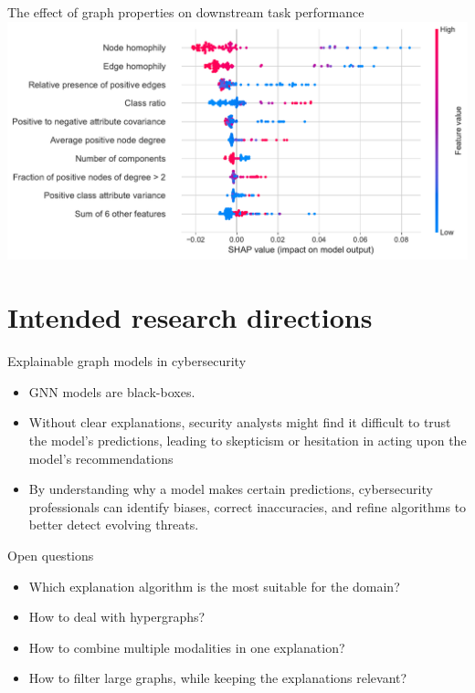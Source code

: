 \documentclass[10pt]{beamer}
\begin{document}
\begin{frame}{The effect of graph properties on downstream task performance}
	\includegraphics[width=\linewidth]{images/graph-property-importance.pdf}
\end{frame}

\section{Intended research directions}

\begin{frame}{Explainable graph models in cybersecurity}
	\begin{itemize}
		\item GNN models are black-boxes.
		\item Without clear explanations, security analysts might find it difficult to trust the model’s predictions, leading to skepticism or hesitation in acting upon the model’s recommendations
		\item By understanding why a model makes certain predictions, cybersecurity professionals can identify biases, correct inaccuracies, and refine algorithms to better detect evolving threats.
	\end{itemize}

	\vspace{10pt}
	{\Large Open questions}

	\begin{itemize}
		\item Which explanation algorithm is the most suitable for the domain?
		\item How to deal with hypergraphs?
		\item How to combine multiple modalities in one explanation?
		\item How to filter large graphs, while keeping the explanations relevant?
	\end{itemize}
\end{frame}
\end{document}
